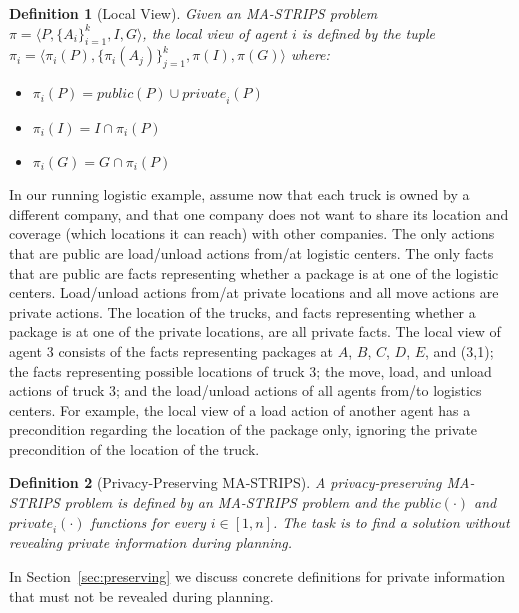 \documentclass[letterpaper]{article}
\newcommand{\private}[2]{\textit{private}_{#1}(#2)}
\newcommand{\public}{\textit{public}}
\newtheorem{definition}{Definition}
\theoremstyle{definition}
\begin{document}
\begin{definition}[Local View]
Given an MA-STRIPS problem $\pi=\langle  P, \{A_i\}_{i=1}^k, I ,G \rangle$,
the {\em local view} of agent $i$ is defined by the tuple
$\pi_i=\langle
\pi_i(P), \{\pi_i(A_j)\}_{j=1}^k,\pi(I),\pi(G)
\rangle
$
where:
\begin{itemize}
\item $\pi_i(P)=\public(P)\cup \private{i}{P}$
\item $\pi_i(I)=I \cap \pi_i(P)$
\item $\pi_i(G)=G \cap \pi_i(P)$
\end{itemize}
\label{def:local-view}
\end{definition}



In our running logistic example, assume now that each truck is owned by a different company, and that one company does not want to share its location and coverage (which locations it can reach) with other companies.
The only actions that are public are load/unload actions from/at logistic centers. The only facts that are public are facts representing whether a package is at one of the logistic centers. Load/unload actions from/at private locations and all move actions are private actions. The location of the trucks, and facts representing whether a package is at one of the private locations, are all private facts.
The local view of agent 3 consists of the facts representing
packages at $A$, $B$, $C$, $D$, $E$, and (3,1);
the facts representing possible locations of truck $3$;
the move, load, and unload actions of truck $3$;
and the load/unload actions of all agents from/to logistics centers.
For example, the local view of a load action of another agent has a precondition regarding the location of the package only, ignoring the private precondition of the location of the truck.





\begin{definition}[Privacy-Preserving MA-STRIPS]
A privacy-preserving MA-STRIPS problem is defined by an MA-STRIPS problem and the $\public(\cdot)$ and $\private{i}{\cdot}$ functions for every $i\in[1,n]$. The task is to find a solution without revealing private information during planning.
\label{def:private-ma-strips}
\end{definition}

In Section~\ref{sec:preserving} we discuss concrete definitions for private information that must not be revealed during planning.
\end{document}
